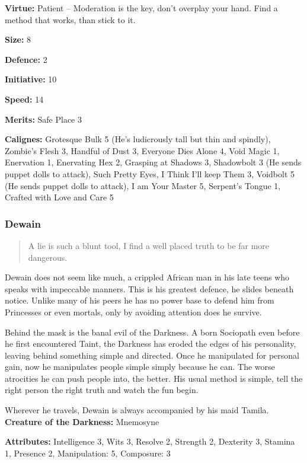 \noindent \textbf{Virtue:} Patient – Moderation is the key, don't overplay your hand. Find a method that works, than stick to it.

\noindent \textbf{Size:} 8

\noindent \textbf{Defence:} 2

\noindent \textbf{Initiative:} 10

\noindent \textbf{Speed:} 14

\noindent \textbf{Merits:} Safe Place 3

\noindent \textbf{Calignes:} Grotesque Bulk 5 (He's ludicrously tall but thin and spindly), Zombie's Flesh 3, Handful of Dust 3, Everyone Dies Alone 4, Void Magic 1, Enervation 1, Enervating Hex 2, Grasping at Shadows 3, Shadowbolt 3 (He sends puppet dolls to attack), Such Pretty Eyes, I Think I'll keep Them 3, Voidbolt 5 (He sends puppet dolls to attack), I am Your Master 5, Serpent's Tongue 1, Crafted with Love and Care 5

\subsubsection*{Dewain}

\begin{quote}A lie is such a blunt tool, I find a well placed truth to be far more dangerous.\end{quote}

Dewain does not seem like much, a crippled African man in his late teens who speaks with impeccable manners. This is his greatest defence, he slides beneath notice. Unlike many of his peers he has no power base to defend him from Princesses or even mortals, only by avoiding attention does he survive.

Behind the mask is the banal evil of the Darkness. A born Sociopath even before he first encountered Taint, the Darkness has eroded the edges of his personality, leaving behind something simple and directed. Once he manipulated for personal gain, now he manipulates people simple simply because he can. The worse atrocities he can push people into, the better. His usual method is simple, tell the right person the right truth and watch the fun begin.

Wherever he travels, Dewain is always accompanied by his maid Tamila.\\

\noindent \textbf{Creature of the Darkness:} Mnemosyne

\noindent \textbf{Attributes:} Intelligence 3, Wits 3, Resolve 2, Strength 2, Dexterity 3, Stamina 1, Presence 2, Manipulation: 5, Composure: 3

